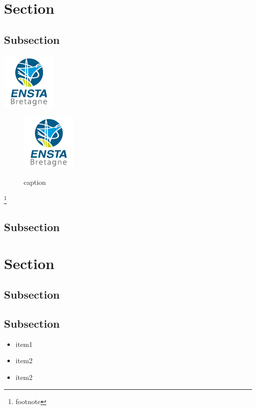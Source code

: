 \documentclass[a4paper]{report}
\begin{document}
\section{Section}
\subsection{Subsection}

	\begin{center}
		\includegraphics[scale=0.5]{image/logo_ensta.png}
	\end{center}

	\begin{figure}[!h]
		\centering
		\includegraphics[scale=0.5]{image/logo_ensta.png}\\
		\caption{caption}
	\end{figure} %

	\footnote{footnote}

\subsection{Subsection}

\section{Section}
\subsection{Subsection}
\subsection{Subsection}

	\begin{itemize}
		\item item1
		\item item2
		\item item2
	\end{itemize}
\end{document}
